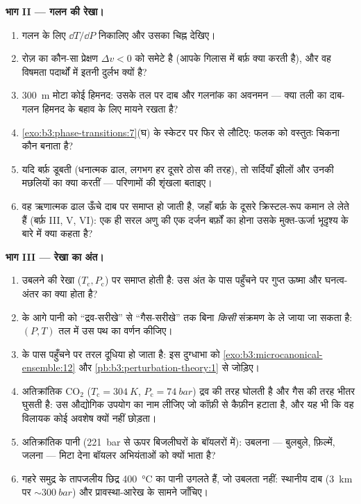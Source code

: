 \begin{problem}
\medskip\noindent\textbf{भाग II --- गलन की रेखा।}
\begin{enumerate}[resume]
  \item गलन के लिए $\dd T/\dd P$ निकालिए और उसका चिह्न देखिए।
  \item रोज़ का कौन-सा प्रेक्षण $\Delta v < 0$ को समेटे है (आपके
        गिलास में बर्फ़ क्या करती है), और वह विषमता पदार्थों में
        इतनी दुर्लभ क्यों है?
  \item \qty{300}{m} मोटा कोई हिमनद: उसके तल पर दाब और गलनांक का
        अवनमन --- क्या तली का दाब-गलन हिमनद के बहाव के लिए मायने
        रखता है?
  \item \cref{exo:b3:phase-transitions:7}(घ) के स्केटर पर फिर से
        लौटिए: फलक को वस्तुतः चिकना कौन बनाता है?
  \item यदि बर्फ़ डूबती (धनात्मक ढाल, लगभग हर दूसरे ठोस की तरह),
        तो सर्दियाँ झीलों और उनकी मछलियों का क्या करतीं ---
        परिणामों की शृंखला बताइए।
  \item वह ऋणात्मक ढाल ऊँचे दाब पर समाप्त हो जाती है, जहाँ बर्फ़
        के दूसरे क्रिस्टल-रूप कमान ले लेते हैं (बर्फ़ III, V, VI):
        एक ही सरल अणु की एक दर्जन बर्फ़ों का होना उसके मुक्त-ऊर्जा
        भूदृश्य के बारे में क्या कहता है?
\end{enumerate}

\medskip\noindent\textbf{भाग III --- रेखा का अंत।}
\begin{enumerate}[resume]
  \item उबलने की रेखा ($T_{\text{c}},
        P_{\text{c}}$) पर समाप्त होती है: उस अंत के पास पहुँचने पर
        गुप्त ऊष्मा और घनत्व-अंतर का क्या होता है?
  \item {} के आगे पानी को ``द्रव-सरीखे'' से
        ``गैस-सरीखे'' तक बिना \emph{किसी} संक्रमण के ले जाया जा
        सकता है: $(P, T)$ तल में उस पथ का वर्णन कीजिए।
  \item {} के पास पहुँचने पर तरल दूधिया हो जाता है:
        इस दुग्धाभा को
        \cref{exo:b3:microcanonical-ensemble:12} और
        \cref{pb:b3:perturbation-theory:1} से जोड़िए।
  \item अतिक्रांतिक CO$_2$ ($T_{\text{c}} = \qty{304}{K}$,
        $P_{\text{c}} = \qty{74}{bar}$) द्रव की तरह घोलती है और
        गैस की तरह भीतर घुसती है: उस औद्योगिक उपयोग का नाम लीजिए
        जो कॉफ़ी से कैफ़ीन हटाता है, और यह भी कि वह विलायक कोई
        अवशेष क्यों नहीं छोड़ता।
  \item अतिक्रांतिक पानी (\qty{221}{bar} से ऊपर बिजलीघरों के
        बॉयलरों में): उबलना --- बुलबुले, फ़िल्में, जलना --- मिटा
        देना बॉयलर अभियंताओं को क्यों भाता है?
  \item गहरे समुद्र के तापजलीय छिद्र \qty{400}{\celsius} का पानी
        उगलते हैं, जो उबलता नहीं: स्थानीय दाब
        (\qty{3}{km} पर $\sim\qty{300}{bar}$) और प्रावस्था-आरेख के
        सामने जाँचिए।
\end{enumerate}


\end{problem}
